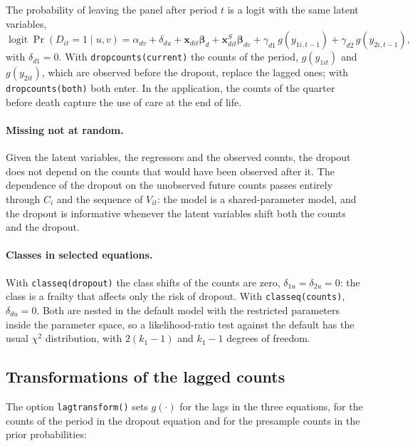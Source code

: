 \documentclass[11pt,a4paper]{article}
\newcommand{\cmd}[1]{\texttt{#1}}
\newcommand{\xv}{\mathbf x}
\begin{document}
The probability of leaving the panel after period $t$ is a logit with the same latent variables,
\begin{equation}\label{eq:drop}
\operatorname{logit}\Pr(D_{it}=1\mid u,v)=\alpha_{dv}+\delta_{du}+\xv_{dit}\bm\beta_d+\xv^S_{dit}\bm\beta_{dv}
+\gamma_{d1}\,g(y_{1i,t-1})+\gamma_{d2}\,g(y_{2i,t-1}),
\end{equation}
with $\delta_{d1}=0$. With \cmd{dropcounts(current)} the counts of the period, $g(y_{1it})$ and
$g(y_{2it})$, which are observed before the dropout, replace the lagged ones; with
\cmd{dropcounts(both)} both enter. In the application, the counts of the quarter before death capture
the use of care at the end of life.

\paragraph{Missing not at random.} Given the latent variables, the regressors and the observed counts,
the dropout does not depend on the counts that would have been observed after it. The dependence of the
dropout on the unobserved future counts passes entirely through $C_i$ and the sequence of $V_{it}$: the
model is a shared-parameter model, and the dropout is informative whenever the latent variables shift
both the counts and the dropout.

\paragraph{Classes in selected equations.} With \cmd{classeq(dropout)} the class shifts of the counts are
zero, $\delta_{1u}=\delta_{2u}=0$: the class is a frailty that affects only the risk of dropout. With
\cmd{classeq(counts)}, $\delta_{du}=0$. Both are nested in the default model with the restricted
parameters inside the parameter space, so a likelihood-ratio test against the default has the usual
$\chi^2$ distribution, with $2(k_1-1)$ and $k_1-1$ degrees of freedom.

\subsection{Transformations of the lagged counts}\label{sec:lags}

The option \cmd{lagtransform()} sets $g(\cdot)$ for the lags in the three equations, for the counts of
the period in the dropout equation and for the presample counts in the prior probabilities:
\end{document}
